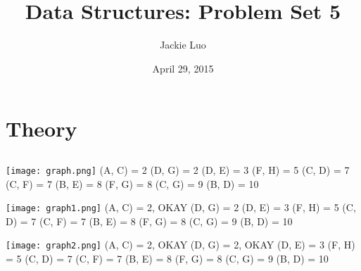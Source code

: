 \documentclass{article}
\title{Data Structures: Problem Set 5}
\author{Jackie Luo}
\date{April 29, 2015}
\begin{document}
\maketitle

\section{Theory}

\subsection{}
\texttt{[image: graph.png]}
\newline
(A, C) = 2
\newline
(D, G) = 2
\newline
(D, E) = 3
\newline
(F, H) = 5
\newline
(C, D) = 7
\newline
(C, F) = 7
\newline
(B, E) = 8
\newline
(F, G) = 8
\newline
(C, G) = 9
\newline
(B, D) = 10
\newline

\texttt{[image: graph1.png]}
\newline
(A, C) = 2, OKAY
\newline
(D, G) = 2
\newline
(D, E) = 3
\newline
(F, H) = 5
\newline
(C, D) = 7
\newline
(C, F) = 7
\newline
(B, E) = 8
\newline
(F, G) = 8
\newline
(C, G) = 9
\newline
(B, D) = 10

\texttt{[image: graph2.png]}
\newline
(A, C) = 2, OKAY
\newline
(D, G) = 2, OKAY
\newline
(D, E) = 3
\newline
(F, H) = 5
\newline
(C, D) = 7
\newline
(C, F) = 7
\newline
(B, E) = 8
\newline
(F, G) = 8
\newline
(C, G) = 9
\newline
(B, D) = 10
\end{document}
